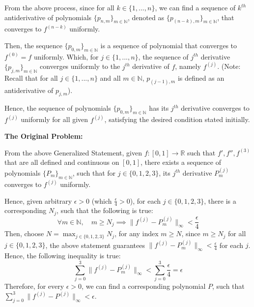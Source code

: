 \documentclass{article}
\begin{document}
\hfill

From the above process, since for all $k\in \{1,...,n\}$, we can find a sequence of $k^{th}$ antiderivative of polynomials $\{p_{n,m}\}_{m\in\mathbb{N}}$, denoted as $\{p_{(n-k),m}\}_{m\in\mathbb{N}}$, that converges to $f^{(n-k)}$ uniformly. 

Then, the sequence $\{p_{0,m}\}_{m\in\mathbb{N}}$ is a sequence of polynomial that converges to $f^{(0)}=f$ uniformly. Which, for $j\in\{1,...,n\}$, the sequence of $j^{th}$ derivative $\{p_{j,m}\}_{m\in\mathbb{N}}$ converges uniformly to the $j^{th}$ derivative of $f$, namely $f^{(j)}$.
(Note: Recall that for all $j\in\{1,...,n\}$ and all $m\in\mathbb{N}$, $p_{(j-1),m}$ is defined as an antiderivative of $p_{j,m}$).

Hence, the sequence of polynomials $\{p_{0,m}\}_{m\in\mathbb{N}}$ has its $j^{th}$ derivative converges to $f^{(j)}$ uniformly for all given $f^{(j)}$, satisfying the desired condition stated initially.

\hfill

\textbf{The Original Problem:}

From the above Generalized Statement, given $f:[0,1]\rightarrow\mathbb{R}$ such that $f',f'',f^{(3)}$ that are all defined and continuous on $[0,1]$, there exists a sequence of polynomials $\{P_m\}_{m\in\mathbb{N}}$, 
such that for $j\in\{0,1,2,3\}$, its $j^{th}$ derivative $P_m^{(j)}$ converges to $f^{(j)}$ uniformly.

Hence, given arbitrary $\epsilon>0$ (which $\frac{\epsilon}{4}>0$), for each $j\in\{0,1,2,3\}$, there is a corresponding $N_j$, such that the following is true:
$$\forall m\in\mathbb{N},\quad m\geq N_j \implies \|f^{(j)}-P_m^{(j)}\|_\infty <\frac{\epsilon}{4}$$
Then, choose $N = \max_{j\in\{0,1,2,3\}}N_j$, for any index $m\geq N$, since $m\geq N_j$ for all $j\in\{0,1,2,3\}$, the above statement guarantees $\|f^{(j)}-P_m^{(j)}\|_\infty <\frac{\epsilon}{4}$ for each $j$.
Hence, the following inequality is true:
$$\sum_{j=0}^{3}\|f^{(j)}-P_m^{(j)}\|_\infty < \sum_{j=0}^{3}\frac{\epsilon}{4}=\epsilon$$
Therefore, for every $\epsilon>0$, we can find a corresponding polynomial $P$, such that $\sum_{j=0}^{3}\|f^{(j)}-P^{(j)}\|_\infty<\epsilon$.
\end{document}
